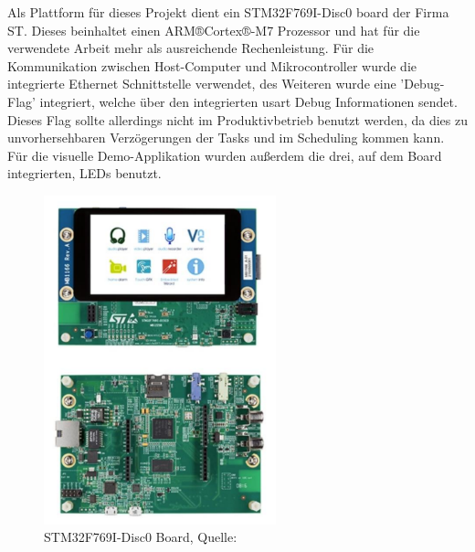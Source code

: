 \documentclass[../EDF Master Thesis.tex]{subfiles}
\begin{document}
Als Plattform für dieses Projekt dient ein STM32F769I-Disc0 board der Firma ST.
Dieses beinhaltet einen ARM®Cortex®-M7 Prozessor und hat für die verwendete Arbeit mehr als ausreichende Rechenleistung.
Für die Kommunikation zwischen Host-Computer und Mikrocontroller wurde die integrierte Ethernet Schnittstelle verwendet, des Weiteren wurde eine 'Debug-Flag' integriert, welche über den integrierten \ac{usart} Debug Informationen sendet.
Dieses Flag sollte allerdings nicht im Produktivbetrieb benutzt werden, da dies zu unvorhersehbaren Verzögerungen der Tasks und im Scheduling kommen kann.
Für die visuelle Demo-Applikation wurden außerdem die drei, auf dem Board integrierten, LEDs benutzt.

\begin{figure}[ht!]
    \begin{center}
        \includegraphics[width=0.6\textwidth]{attachments/stm32f769i-disc0.pdf}
    \end{center}
    \caption{STM32F769I-Disc0 Board, Quelle: \autocite{stm:001}}
    \label{fig:STM32F769I-Disc0_board}
\end{figure}
\end{document}
